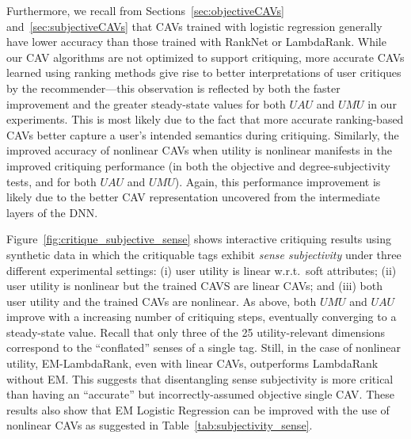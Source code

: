 \documentclass[manuscript,screen,nonacm]{acmart}
\newcommand{\1}{{\mathbf 1}}
\newcommand{\UAU}{\mathit{UAU}}
\newcommand{\UMU}{\mathit{UMU}}
\theoremstyle{TheoremNum}
\begin{document}
Furthermore, we recall from
Sections~\ref{sec:objectiveCAVs} and~\ref{sec:subjectiveCAVs}
that CAVs trained with logistic regression generally have lower accuracy than those trained with RankNet or LambdaRank. 
While our CAV algorithms are not optimized to support critiquing, more accurate CAVs learned using ranking methods give rise to better interpretations of user critiques by the recommender---this observation is reflected by both the faster improvement and the greater steady-state values for both $\UAU$ and $\UMU$ in our experiments. 
This is most likely due to the fact that more accurate ranking-based CAVs better capture a user's intended semantics during critiquing. Similarly, the improved accuracy of nonlinear CAVs when utility is nonlinear manifests in the improved critiquing performance (in both the objective and degree-subjectivity tests, and for both $\UAU$ and $\UMU$).
Again, this performance improvement is likely due to the better CAV representation uncovered from the intermediate layers of the DNN.

Figure~\ref{fig:critique_subjective_sense} shows interactive critiquing results using synthetic data in which the critiquable tags exhibit \emph{sense subjectivity} under three different experimental settings: (i) user utility is linear w.r.t.\ soft attributes; (ii) user utility is nonlinear but the trained CAVS are linear CAVs; and (iii) both user utility and the trained CAVs are nonlinear. As above, both $\UMU$ and $\UAU$ improve with a increasing number of critiquing steps, eventually converging to a steady-state value. Recall that only three of the 25 utility-relevant dimensions correspond to the ``conflated'' senses of a single tag. Still, in the case of nonlinear utility, EM-LambdaRank, even with linear CAVs, outperforms LambdaRank without EM. This suggests that disentangling sense subjectivity is more critical than having an ``accurate'' but incorrectly-assumed objective single CAV.
These results also show that EM Logistic Regression can be improved with the use of nonlinear CAVs as suggested in Table~\ref{tab:subjectivity_sense}.
\end{document}
